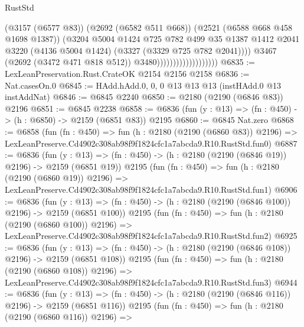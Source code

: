 \begin{lexlean}{RustStd}
\begin{coremodule}
                                            (@3157 (@6577 @83))
                                            (@2692 (@6582 @511 @668))
                                            (@2521 (@6588 @668 @458 @1698 @1387))
                                            (@3204
                                              @5004
                                              @1424
                                              @725
                                              @782
                                              @499
                                              @35
                                              @1387
                                              @1412
                                              @2041
                                              @3220
                                              (@4136 @5004 @1424)
                                              (@3327 (@3329 @725 @782 @2041))))
                                          @3467
                                          (@2692 (@3472 @471 @818 @512))
                                          @3480)))))))))))))))))))
@6835 := LexLeanPreservation.Rust.CrateOK @2154 @2156 @2158
@6836 := Nat.casesOn.{0}
@6845 := HAdd.hAdd.{0, 0, 0} @13 @13 @13 (instHAdd.{0} @13 instAddNat)
@6846 := @6845 @2240
@6850 := @2180 (@2190 (@6846 @83)) @2196
@6851 := @6845 @2238
@6858 := @6836 (fun (y : @13) => (fn : @450) -> (h : @6850) -> @2159 (@6851 @83)) @2195
@6860 := @6845 Nat.zero
@6868 := @6858
    (fun (fn : @450) =>
    fun (h : @2180 (@2190 (@6860 @83)) @2196) =>
    LexLeanPreserve.Cd4902c308ab98f9f1824cfc1a7abcda9.R10.RustStd.fun0)
@6887 := @6836
    (fun (y : @13) => (fn : @450) -> (h : @2180 (@2190 (@6846 @19)) @2196) -> @2159 (@6851 @19))
    @2195
    (fun (fn : @450) =>
    fun (h : @2180 (@2190 (@6860 @19)) @2196) =>
    LexLeanPreserve.Cd4902c308ab98f9f1824cfc1a7abcda9.R10.RustStd.fun1)
@6906 := @6836
    (fun (y : @13) => (fn : @450) -> (h : @2180 (@2190 (@6846 @100)) @2196) -> @2159 (@6851 @100))
    @2195
    (fun (fn : @450) =>
    fun (h : @2180 (@2190 (@6860 @100)) @2196) =>
    LexLeanPreserve.Cd4902c308ab98f9f1824cfc1a7abcda9.R10.RustStd.fun2)
@6925 := @6836
    (fun (y : @13) => (fn : @450) -> (h : @2180 (@2190 (@6846 @108)) @2196) -> @2159 (@6851 @108))
    @2195
    (fun (fn : @450) =>
    fun (h : @2180 (@2190 (@6860 @108)) @2196) =>
    LexLeanPreserve.Cd4902c308ab98f9f1824cfc1a7abcda9.R10.RustStd.fun3)
@6944 := @6836
    (fun (y : @13) => (fn : @450) -> (h : @2180 (@2190 (@6846 @116)) @2196) -> @2159 (@6851 @116))
    @2195
    (fun (fn : @450) =>
    fun (h : @2180 (@2190 (@6860 @116)) @2196) =>

\end{coremodule}
\end{lexlean}
